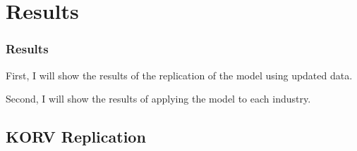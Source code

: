\documentclass[notes,11pt, aspectratio=169]{beamer}
\newenvironment{wideitemize}{\itemize\addtolength{\itemsep}{10pt}}{\enditemize}
\begin{document}
\section{Results}
\begin{frame}
 \frametitle{Results}
 \begin{wideitemize}
 \item First, I will show the results of the replication of the model using updated data.
 \item Second, I will show the results of applying the model to each industry.
 \end{wideitemize}
\end{frame}

\subsection{KORV Replication}
\end{document}
